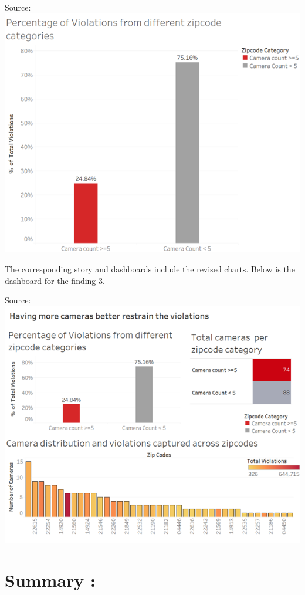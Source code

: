 \documentclass[]{book}
\begin{document}
Source: \citep{revised}
\includegraphics{images/Rev_img11.png}

The corresponding story and dashboards include the revised charts. Below is the dashboard for the finding 3.

Source: \citep{revised}
\includegraphics{images/Rev_img12.png}

\hypertarget{summary-1}{%
\section{Summary :}\label{summary-1}}
\end{document}
